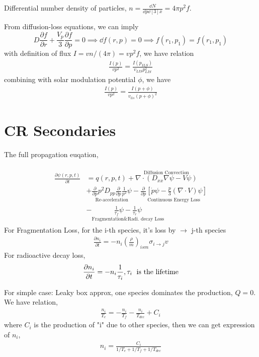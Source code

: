 \documentclass{sciposter}
\begin{document}
\begin{multicols}{3}
Differential number density of particles, $n=\frac{\dd{N}}{\dd{p}\dd[3]{x}}=4\pi p^{2}f $.

From diffusion-loss equations, we can imply $$D\frac{\partial f}{\partial r}+\frac{V_{p} }{3}\frac{\partial f}{\partial p}=0 \implies \dd{f}(r,p)=0 \implies f(r_{1},p_{1}  )=f(r_{1},p_{1}  )  $$ 
with definition of flux $I=v n/(4 \pi)=vp^{2}f  $, we have relation
\begin{align}
    \frac{I(p)}{v p^{2} }=\frac{I(p_{ILS} ) }{v_{LIS}p_{LIS}^{2}   }
\end{align}
combining with solar modulation potential $\phi$, we have 
\begin{align}
    \frac{I(p)}{v p^{2} }=\frac{I(p+\phi ) }{v_{lis}(p+\phi)^{2}    }
\end{align}

\section{CR Secondaries}
The full propagation euqation,

\begin{align}
    \begin{aligned}
      \frac{\partial \psi(r,p,t)}{\partial t}&=q(r,p,t)+\overset{\text{Diffusion Convection}}{\nabla\cdot (D_{xx}\nabla \psi-V\psi )}\\
      &+\underset{\text{Re-acceleration}}{\frac{\partial  }{\partial p}p^{2}D_{pp}\frac{\partial }{\partial p}\frac{1}{p^{2} }\psi  }-\underset{\text{Continuous Energy Loss}}{\frac{\partial }{\partial p}\left[\dot{p}\psi-\frac{p}{3}(\nabla\cdot V)\psi\right]}\\
      &-\underset{\text{Fragmentation\& Radi. decay Loss}}{\frac{1}{\tau_{f} }\psi-\frac{1}{\tau_{r} }\psi}
    \end{aligned}
\end{align}
For Fragmentation Loss, for the i-th species, it's loss by $\rightarrow$ j-th species 
\begin{align}
    \frac{\partial n_{i} }{\partial t}=-n_{i}(\frac{\rho}{m})_{ism}\sigma_{i\rightarrow j}v   
\end{align}
 For radioactive decay loss,
 \begin{align}
     \frac{\partial n_{i} }{\partial t}=-n_{i}\frac{1}{\tau_{i} }, \tau_{i} \text{\; is the lifetime}  
 \end{align}

For simple case: Leaky box approx, one species dominates the production, $Q=0$. We have relation,
\begin{align}
    \frac{n_{i} }{T_{e} }=-\frac{n_{i} }{T_{f} }-\frac{n_{i} }{T_{dec} }+C_{i} 
\end{align}
where $C_{i} $ is the production of "i" due to other species, then we can get expression of $n_{i} $,
\begin{align}
    n_{i}=\frac{C_{i} }{1/T_{e}+1/T_{f}+1/T_{dec}   } 
\end{align}







\end{multicols}
\end{document}
